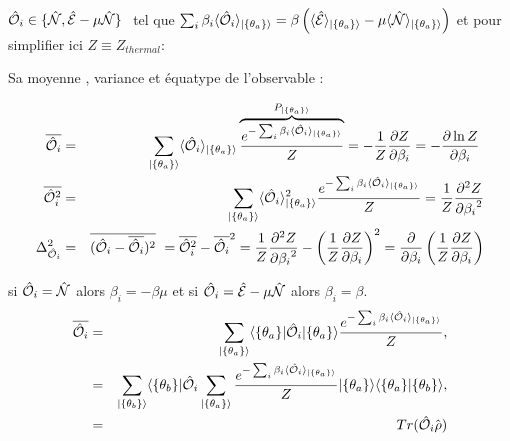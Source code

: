	$\operator{\mathcal{O}}_i \in \{\operator{\mathcal{N}} , \operator{\mathcal{E}} - \mu \operator{\mathcal{N}} \} $  tel que $\sum_i \beta_i \langle \hat{\mathbf{\mathcal{O}}}_i \rangle_{\vert \{\theta_a \} \rangle} = \beta \left ( \langle \hat{\mathbf{\mathcal{E}}} \rangle_{\vert \{\theta_a \} \rangle}   - \mu \langle \hat{\mathbf{\mathcal{N}}} \rangle_{\vert \{\theta_a \} \rangle} \right ) $ et pour simplifier ici $Z \equiv Z_{thermal}$:
	
	Sa  moyenne , variance et équatype de l'observable :
		
	\begin{eqnarray}
		\overline{\operator{\mathcal{O}}_i } & = & \sum_{\vert \{\theta_a \} \rangle} 	\langle \operator{\mathcal{O}}_i \rangle_{\vert \{\theta_a \} \rangle} \overbrace{\frac{e^{-\sum_i \beta_i \langle \operator{\mathcal{O}}_i \rangle_{\vert \{\theta_a \} \rangle} }}{Z}}^{P_{\vert \{\theta_a \} \rangle}} = - \frac{1}{Z}\frac{ \partial Z }{ \partial \beta_i } =  - \frac{ \partial \ln Z }{ \partial \beta_i } \\
		\overline{\operator{\mathcal{O}}_i^2 } & = & \sum_{\vert \{\theta_a \} \rangle} 	\langle \operator{\mathcal{O}}_i \rangle_{\vert \{\theta_a \} \rangle}^2 \frac{e^{-\sum_i \beta_i \langle \operator{\mathcal{O}}_i \rangle_{\vert \{\theta_a \} \rangle} }}{Z} = \frac{1}{Z} \frac{ \partial^2 Z }{ {\partial \beta_i}^2 }\\
		\Delta_{\operator{\mathcal{O}}_i}^2  & = & 	\overline{(\operator{\mathcal{O}}_i - \overline{\operator{\mathcal{O}}_i})^2 }  = 	\overline{\operator{\mathcal{O}}_i^2 }  -  \overline{\operator{\mathcal{O}}_i }^2 = \frac{1}{Z} \frac{ \partial^2 Z }{ {\partial \beta_i}^2 } - \left ( \frac{1}{Z}\frac{ \partial Z }{ \partial \beta_i }\right )^2 = \frac{\partial}{\partial \beta_i } \left ( \frac{1}{Z} \frac{\partial Z}{\partial \beta_i } \right )	
	\end{eqnarray}
	
	si $\hat{\mathbf{\mathcal{O}}}_i = \hat{\mathbf{\mathcal{N}}}$ alors $\beta_i = - \beta \mu $ et si $\hat{\mathbf{\mathcal{O}}}_i = \hat{\mathbf{\mathcal{E}}} - \mu \hat{\mathbf{\mathcal{N}}} $ alors $\beta_i = \beta$.\\
	
	\begin{eqnarray}
		\overline{\hat{\mathbf{\mathcal{O}}}_i } & = & 	\sum_{\vert \{\theta_a \} \rangle} 	\langle \{\theta_a \}  \vert \hat{\mathbf{\mathcal{O}}}_i \vert \{\theta_a \}  \rangle \frac{e^{-\sum_i \beta_i \langle \hat{\mathbf{\mathcal{O}}}_i \rangle_{\vert \{\theta_a \} \rangle} }}{Z},\\
		& = & 	\sum_{\vert \{\theta_b \} \rangle} \langle \{\theta_b \}  \vert  \hat{\mathbf{\mathcal{O}}}_i \sum_{\vert \{\theta_a \} \rangle }\frac{e^{-\sum_i \beta_i \langle \hat{\mathbf{\mathcal{O}}}_i \rangle_{\vert \{\theta_a \} \rangle} }}{Z} \vert \{\theta_a \}  \rangle  	\langle \{\theta_a \}  \vert  \{\theta_b \}  \rangle ,\\
		& = & Tr (  \hat{\mathbf{\mathcal{O}}}_i \hat{\mathbf{\rho}}) 
	\end{eqnarray}
	
